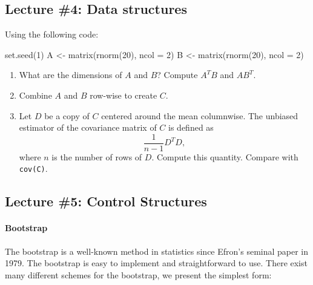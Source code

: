 \documentclass[
]{article}
\newenvironment{Shaded}{}{}
\newcommand{\AttributeTok}[1]{#1}
\newcommand{\DecValTok}[1]{#1}
\newcommand{\FunctionTok}[1]{#1}
\newcommand{\NormalTok}[1]{#1}
\newcommand{\OtherTok}[1]{#1}
\providecommand{\tightlist}{%
  \setlength{\itemsep}{0pt}\setlength{\parskip}{0pt}}
\begin{document}
\hypertarget{lecture-4-data-structures}{%
\subsection{Lecture \#4: Data
structures}\label{lecture-4-data-structures}}

Using the following code:

\begin{Shaded}
\begin{Highlighting}[]
\FunctionTok{set.seed}\NormalTok{(}\DecValTok{1}\NormalTok{)}
\NormalTok{A }\OtherTok{\textless{}{-}} \FunctionTok{matrix}\NormalTok{(}\FunctionTok{rnorm}\NormalTok{(}\DecValTok{20}\NormalTok{), }\AttributeTok{ncol =} \DecValTok{2}\NormalTok{)}
\NormalTok{B }\OtherTok{\textless{}{-}} \FunctionTok{matrix}\NormalTok{(}\FunctionTok{rnorm}\NormalTok{(}\DecValTok{20}\NormalTok{), }\AttributeTok{ncol =} \DecValTok{2}\NormalTok{)}
\end{Highlighting}
\end{Shaded}

\begin{enumerate}
\def\labelenumi{\arabic{enumi}.}
\tightlist
\item
  What are the dimensions of \(A\) and \(B\)? Compute \(A^TB\) and
  \(AB^T\).
\item
  Combine \(A\) and \(B\) row-wise to create \(C\).
\item
  Let \(D\) be a copy of \(C\) centered around the mean columnwise. The
  unbiased estimator of the covariance matrix of \(C\) is defined as
  \[\frac{1}{n-1}D^TD,\] where \(n\) is the number of rows of \(D\).
  Compute this quantity. Compare with \texttt{cov(C)}.
\end{enumerate}

\hypertarget{lecture-5-control-structures}{%
\subsection{Lecture \#5: Control
Structures}\label{lecture-5-control-structures}}

\hypertarget{bootstrap}{%
\paragraph{Bootstrap}\label{bootstrap}}

The bootstrap is a well-known method in statistics since Efron's seminal
paper in 1979. The bootstrap is easy to implement and straightforward to
use. There exist many different schemes for the bootstrap, we present
the simplest form:
\end{document}
